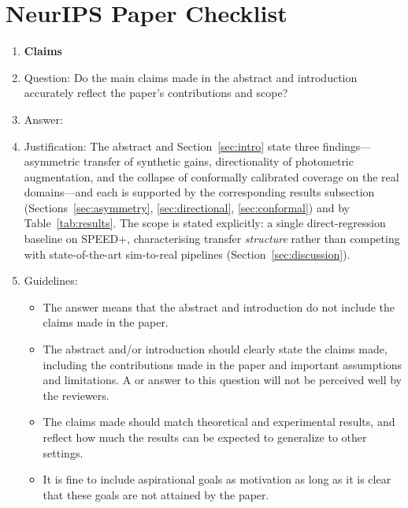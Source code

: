 \section*{NeurIPS Paper Checklist}




\begin{enumerate}

\item {\bf Claims}
    \item[] Question: Do the main claims made in the abstract and introduction accurately reflect the paper's contributions and scope?
    \item[] Answer: \answerYes{}
    \item[] Justification: The abstract and Section~\ref{sec:intro} state three findings---asymmetric transfer of
    synthetic gains, directionality of photometric augmentation, and the collapse of
    conformally calibrated coverage on the real domains---and each is supported by the
    corresponding results subsection (Sections~\ref{sec:asymmetry}, \ref{sec:directional},
    \ref{sec:conformal}) and by Table~\ref{tab:results}. The scope is stated explicitly: a
    single direct-regression baseline on SPEED+, characterising transfer \emph{structure}
    rather than competing with state-of-the-art sim-to-real pipelines
    (Section~\ref{sec:discussion}).
    \item[] Guidelines:
    \begin{itemize}
        \item The answer \answerNA{} means that the abstract and introduction do not include the claims made in the paper.
        \item The abstract and/or introduction should clearly state the claims made, including the contributions made in the paper and important assumptions and limitations. A \answerNo{} or \answerNA{} answer to this question will not be perceived well by the reviewers. 
        \item The claims made should match theoretical and experimental results, and reflect how much the results can be expected to generalize to other settings. 
        \item It is fine to include aspirational goals as motivation as long as it is clear that these goals are not attained by the paper. 
    \end{itemize}


\end{enumerate}
